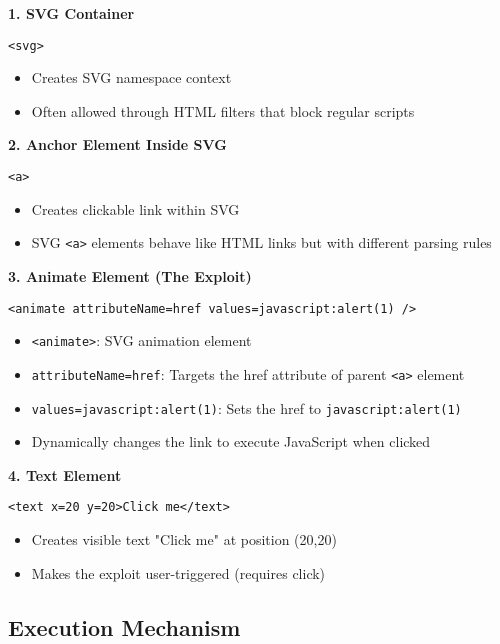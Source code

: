 \documentclass{article}
\begin{document}
\begin{itemize}
\textbf{1. SVG Container}
\begin{lstlisting}[frame=single]
<svg>
\end{lstlisting}
\begin{itemize}
    \item Creates SVG namespace context
    \item Often allowed through HTML filters that block regular scripts
\end{itemize}

\textbf{2. Anchor Element Inside SVG}
\begin{lstlisting}[frame=single]
<a>
\end{lstlisting}
\begin{itemize}
    \item Creates clickable link within SVG
    \item SVG \texttt{<a>} elements behave like HTML links but with different parsing rules
\end{itemize}

\textbf{3. Animate Element (The Exploit)}
\begin{lstlisting}[frame=single]
<animate attributeName=href values=javascript:alert(1) />
\end{lstlisting}
\begin{itemize}
    \item \texttt{<animate>}: SVG animation element
    \item \texttt{attributeName=href}: Targets the href attribute of parent \texttt{<a>} element
    \item \texttt{values=javascript:alert(1)}: Sets the href to \texttt{javascript:alert(1)}
    \item Dynamically changes the link to execute JavaScript when clicked
\end{itemize}

\textbf{4. Text Element}
\begin{lstlisting}[frame=single]
<text x=20 y=20>Click me</text>
\end{lstlisting}
\begin{itemize}
    \item Creates visible text "Click me" at position (20,20)
    \item Makes the exploit user-triggered (requires click)
\end{itemize}

\subsection*{Execution Mechanism}


\end{itemize}
\end{document}
